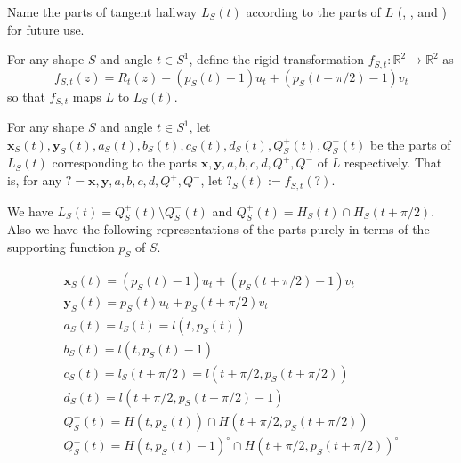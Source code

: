 Name the parts of tangent hallway \(L_S(t)\) according to the parts of \(L\) (, , and ) for future use.

\begin{definition}

For any shape \(S\) and angle \(t \in S^1\), define the rigid transformation \(f_{S, t} : \mathbb{R}^2 \to \mathbb{R}^2\) as
\[
f_{S, t}(z) = R_t(z) + (p_S(t) - 1)  u_t + (p_S(t + \pi/2) - 1) v_t
\]
so that \(f_{S, t}\) maps \(L\) to \(L_S(t)\).

\label{def:tangent-hallway-map}
\end{definition}

\begin{definition}

For any shape \(S\) and angle \(t \in S^1\), let \(\mathbf{x}_S(t), \mathbf{y}_S(t), a_S(t), b_S(t), c_S(t), d_S(t), Q^+_S(t), Q^-_S(t)\) be the parts of \(L_S(t)\) corresponding to the parts \(\mathbf{x}, \mathbf{y}, a, b, c, d, Q^+, Q^-\) of \(L\) respectively. That is, for any \(? = \mathbf{x}, \mathbf{y}, a, b, c, d, Q^+, Q^-\), let \(?_S(t) := f_{S, t}(?)\).

\label{def:rotating-hallway-parts}
\end{definition}

\begin{proposition}

We have \(L_S(t) = Q_S^+(t) \setminus Q_S^-(t)\) and \(Q^+_S(t) = H_S(t) \cap H_S(t + \pi/2)\). Also we have the following representations of the parts purely in terms of the supporting function \(p_S\) of \(S\).

\begin{gather*}
\mathbf{x}_S(t) = (p_S(t) - 1) u_t + (p_S(t + \pi/2) - 1) v_t \\
\mathbf{y}_S(t) = p_S(t) u_t + p_S(t + \pi/2) v_t \\
a_S(t) = l_S(t) = l(t, p_S(t)) \\
b_S(t) = l(t, p_S(t) - 1) \\
c_S(t) = l_S(t + \pi/2) = l(t + \pi/2, p_S(t + \pi/2)) \\
d_S(t) = l(t + \pi/2, p_S(t + \pi/2) - 1) \\
Q_S^+(t) = H(t, p_S(t)) \cap H(t + \pi/2, p_S(t + \pi/2)) \\
Q_S^-(t) = H(t, p_S(t) - 1)^{\circ} \cap H(t + \pi/2, p_S(t + \pi/2))^{\circ}
\end{gather*}

\label{pro:rotating-hallway-parts}
\end{proposition}

